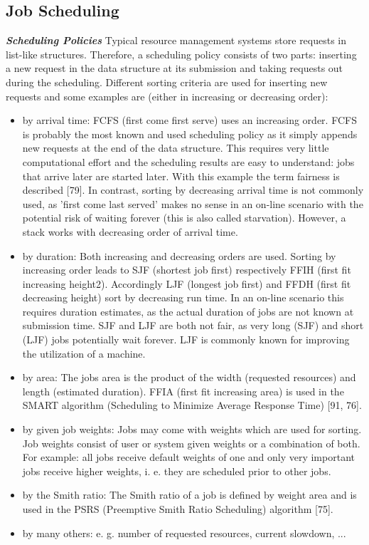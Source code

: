 \subsection{Job Scheduling}
\textbf{\textit{Scheduling Policies }}Typical resource management systems store requests in list-like structures. Therefore, a
scheduling policy consists of two parts: inserting a new request in the data structure at its submission and taking requests out during the scheduling. Different sorting criteria are used for inserting new requests and some examples are (either in increasing or decreasing order):
\begin{itemize}
\item by arrival time: FCFS (first come first serve) uses an increasing order. FCFS is probably the most known and used scheduling policy as it simply appends new requests at the end of the data structure. This requires very little computational effort and the scheduling results are easy to understand: jobs that arrive later are started later. With this example the term fairness is described [79]. In contrast, sorting by decreasing arrival time is not commonly used, as ’first come last served’ makes no sense in an on-line scenario with the potential risk of waiting forever (this is also called starvation). However, a stack works with decreasing order of arrival time.
\item by duration: Both increasing and decreasing orders are used. Sorting by increasing order leads to SJF (shortest job first) respectively FFIH (first fit increasing height2). Accordingly LJF (longest job first) and FFDH (first fit decreasing height) sort by decreasing run time. In an on-line scenario this requires duration estimates, as the actual duration of jobs are not known at submission time. SJF and LJF are both not fair, as very long (SJF) and short (LJF) jobs potentially wait forever. LJF is commonly known for improving the utilization of a machine.
\item by area: The jobs area is the product of the width (requested resources) and length (estimated duration). FFIA (first fit increasing area) is used in the SMART algorithm (Scheduling to Minimize Average Response Time) [91, 76]. 
\item by given job weights: Jobs may come with weights which are used for sorting. Job weights consist of user or system given weights or a combination of both. For example: all jobs receive default weights of one and only very important jobs receive higher weights, i. e. they are scheduled prior to other jobs.
\item by the Smith ratio: The Smith ratio of a job is defined by weight area and is used in the PSRS (Preemptive Smith Ratio Scheduling) algorithm [75].
\item by many others: e. g. number of requested resources, current slowdown, ...
\end{itemize}

